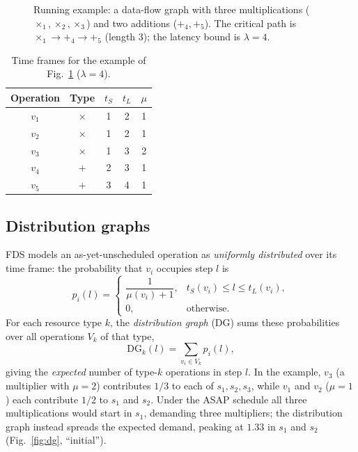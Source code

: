 \documentclass[conference]{IEEEtran}
\begin{document}
\begin{figure}[t]
\centering
{}
\caption{Running example: a data-flow graph with three multiplications
($\times_1,\times_2,\times_3$) and two additions ($+_4,+_5$). The critical path
is $\times_1\!\to\!+_4\!\to\!+_5$ (length 3); the latency bound is $\lambda=4$.}
\label{fig:dfg}
\end{figure}

\begin{table}[t]
\caption{Time frames for the example of Fig.~\ref{fig:dfg} ($\lambda=4$).}
\label{tab:frames}
\centering
\footnotesize
\renewcommand{\arraystretch}{1.15}
\begin{tabular}{c c c c c}
\hline
Operation & Type & $t_S$ & $t_L$ & $\mu$ \\
\hline
$v_1$ & $\times$ & 1 & 2 & 1 \\
$v_2$ & $\times$ & 1 & 2 & 1 \\
$v_3$ & $\times$ & 1 & 3 & 2 \\
$v_4$ & $+$       & 2 & 3 & 1 \\
$v_5$ & $+$       & 3 & 4 & 1 \\
\hline
\end{tabular}
\end{table}

\subsection{Distribution graphs}
FDS models an as-yet-unscheduled operation as \emph{uniformly distributed} over
its time frame: the probability that $v_i$ occupies step $l$ is
\begin{equation}
p_i(l) =
\begin{cases}
\dfrac{1}{\mu(v_i)+1}, & t_S(v_i)\le l\le t_L(v_i),\\[2mm]
0, & \text{otherwise.}
\end{cases}
\label{eq:prob}
\end{equation}
For each resource type $k$, the \emph{distribution graph} (DG) sums these
probabilities over all operations $V_k$ of that type,
\begin{equation}
\mathrm{DG}_k(l) = \sum_{v_i \in V_k} p_i(l),
\label{eq:dg}
\end{equation}
giving the \emph{expected} number of type-$k$ operations in step $l$. In the
example, $v_3$ (a multiplier with $\mu=2$) contributes $1/3$ to each of
$s_1,s_2,s_3$, while $v_1$ and $v_2$ ($\mu=1$) each contribute $1/2$ to $s_1$
and $s_2$. Under the ASAP schedule all three multiplications would start in
$s_1$, demanding three multipliers; the distribution graph instead spreads the
expected demand, peaking at $1.33$ in $s_1$ and $s_2$
(Fig.~\ref{fig:dg}, ``initial'').
\end{document}
